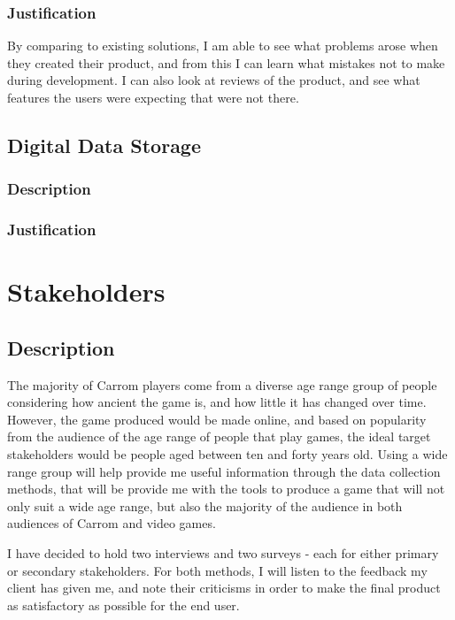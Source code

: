 \documentclass[11pt,a4paper]{report}
\begin{document}
\subsubsection{Justification}
By comparing to existing solutions, I am able to see what problems arose when they created their product, and from this I can learn what mistakes not to make during development. I can also look at reviews of the product, and see what features the users were expecting that were not there.


\subsection{Digital Data Storage}

\subsubsection{Description}


\subsubsection{Justification}



\section{Stakeholders}

\subsection{Description}
The majority of Carrom players come from a diverse age range group of people considering how ancient the game is, and how little it has changed over time. However, the game produced would be made online, and based on popularity from the audience of the age range of people that play games, the ideal target stakeholders would be people aged between ten and forty years old. Using a wide range group will help provide me useful information through the data collection methods, that will be provide me with the tools to produce a game that will not only suit a wide age range, but also the majority of the audience in both audiences of Carrom and video games. \newline

\noindent I have decided to hold two interviews and two surveys - each for either primary or secondary stakeholders. For both methods, I will listen to the feedback my client has given me, and note their criticisms in order to make the final product as satisfactory as possible for the end user. \newline
\end{document}
